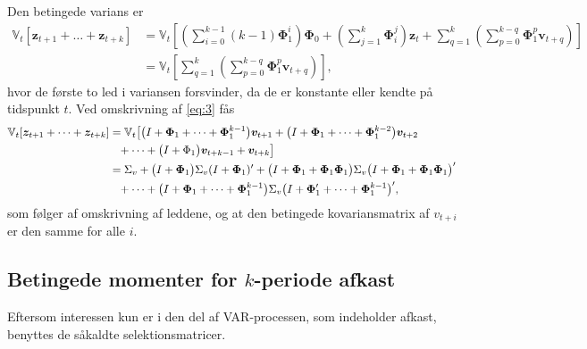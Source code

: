 \documentclass[
  a4paper,
  oneside]{memoir}
\begin{document}
\vspace{5mm}

Den betingede varians er
\begin{align}
        \mathbb{V}_t[\bm{z}_{t+1}+\dots+\bm{z}_{t+k}]
        &=\mathbb{V}_t\left[\left(\sum_{i=0}^{k-1}(k-1)\bm{\Phi}_1^i\right)\bm{\Phi}_0+\left(\sum_{j=1}^k \bm{\Phi}_i^j\right)\bm{z}_t +\sum_{q=1}^k\left(\sum_{p=0}^{k-q}\bm{\Phi}_1^p \bm{v}_{t+q}\right)\right] \nonumber\\
        &=\mathbb{V}_t\left[\sum_{q=1}^k\left(\sum_{p=0}^{k-q} \bm{\Phi}_1^p \bm{v}_{t+q}\right)\right] \label{eq:3},
    \end{align}
hvor de første to led i variansen forsvinder, da de er konstante eller kendte på tidspunkt \(t\). Ved omskrivning af \eqref{eq:3} fås
\begin{align*}
        \mathbb{V}_t[\bm{z}_{t+1}+\dots+\bm{z}_{t+k}]&=\mathbb{V}_t\big[\big(I+\bm{\Phi}_1+\dots+\bm{\Phi}_1^{k-1}\big)\bm{v}_{t+1}+\big(I+\bm{\Phi}_1+\dots+\bm{\Phi}_1^{k-2}\big)\bm{v}_{t+2}\\
        &\hphantom{=}+\dots+\big(I+\Phi_1\big)\bm{v}_{t+k-1}+\bm{v}_{t+k}\big]\\
        &=\Sigma_v+\big(I+\bm{\Phi}_1\big)\Sigma_v(I+\bm{\Phi}_1)'+\big(I+\bm{\Phi}_1+\bm{\Phi}_1\bm{\Phi}_1\big)\Sigma_v\big(I+\bm{\Phi}_1+\bm{\Phi}_1\bm{\Phi}_1\big)'\\
        &\hphantom{=}+\dots+\big(I+\bm{\Phi}_1+\dots+\bm{\Phi}_1^{k-1}\big)\Sigma_v\big(I+\bm{\Phi}_1'+\dots+\bm{\Phi}_1^{k-1}\big)',
    \end{align*}
som følger af omskrivning af leddene, og at den betingede kovariansmatrix af \(v_{t+i}\) er den samme for alle \(i\).

\subsection{Betingede momenter for $k$-periode afkast}

Eftersom interessen kun er i den del af VAR-processen, som indeholder afkast, benyttes de såkaldte selektionsmatricer.
\end{document}

